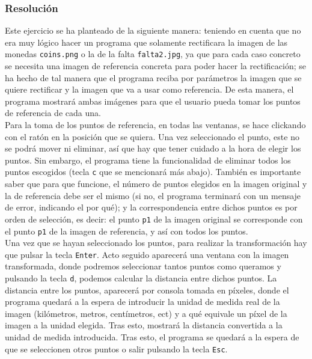 \documentclass[a4paper,10pt,titlepage,oneside,openright]{book}
\begin{document}
\subsubsection*{Resolución}
Este ejercicio se ha planteado de la siguiente manera: teniendo en cuenta que no era muy lógico hacer un programa que solamente rectificara la imagen de las monedas \texttt{coins.png} o la de la falta \texttt{falta2.jpg}, ya que para cada caso concreto se necesita una imagen de referencia concreta para poder hacer la rectificación; se ha hecho de tal manera que el programa reciba por parámetros la imagen que se quiere rectificar y la imagen que va a usar como referencia. De esta manera, el programa mostrará ambas imágenes para que el usuario pueda tomar los puntos de referencia de cada una. \\

Para la toma de los puntos de referencia, en todas las ventanas, se hace clickando con el ratón en la posición que se quiera. Una vez seleccionado el punto, este no se podrá mover ni eliminar, así que hay que tener cuidado a la hora de elegir los puntos. Sin embargo, el programa tiene la funcionalidad de eliminar todos los puntos escogidos (tecla \texttt{c} que se mencionará más abajo). También es importante saber que para que funcione, el número de puntos elegidos en la imagen original y la de referencia debe ser el mismo (si no, el programa terminará con un mensaje de error, indicando el por qué); y la correspondencia entre dichos puntos es por orden de selección, es decir: el punto \texttt{p1} de la imagen original se corresponde con el punto \texttt{p1} de la imagen de referencia, y así con todos los puntos. \\

Una vez que se hayan seleccionado los puntos, para realizar la transformación hay que pulsar la tecla \texttt{Enter}. Acto seguido aparecerá una ventana con la imagen transformada, donde podremos seleccionar tantos puntos como queramos y pulsando la tecla \texttt{d}, podemos calcular la distancia entre dichos puntos. La distancia entre los puntos, aparecerá por consola tomada en píxeles, donde el programa quedará a la espera de introducir la unidad de medida real de la imagen (kilómetros, metros, centímetros, ect) y a qué equivale un píxel de la imagen a la unidad elegida. Tras esto, mostrará la distancia convertida a la unidad de medida introducida. Tras esto, el programa se quedará a la espera de que se seleccionen otros puntos o salir pulsando la tecla \texttt{Esc}. \\
\end{document}
